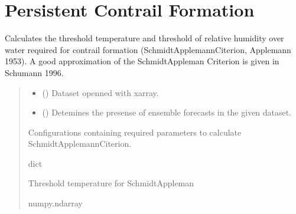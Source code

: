 \documentclass[a4paper,11pt,english]{sphinxmanual}
\begin{document}
\label{\detokenize{modules:module-climaccf.weather_store}}

\section{Persistent Contrail Formation}
\label{\detokenize{modules:module-climaccf.contrail}}\label{\detokenize{modules:persistent-contrail-formation}}

\begin{fulllineitems}
\label{\detokenize{modules:climaccf.contrail.get_cont_form_thr}}
\pysigstartsignatures
{}
\pysigstopsignatures
\sphinxAtStartPar
Calculates the threshold temperature and threshold of relative humidity over water required for contrail formation (Schmidt\sphinxhyphen{}Applemann\sphinxhyphen{}Citerion, Applemann 1953). A good approximation of the Schmidt\sphinxhyphen{}Appleman Criterion is given in Schumann 1996.
\begin{quote}\begin{description}
\begin{itemize}
\item {} 
\sphinxAtStartPar
{} () \textendash{} Dataset openned with xarray.

\item {} 
\sphinxAtStartPar
{} () \textendash{} Detemines the presense of ensemble forecasts in the given dataset.

\end{itemize}

\sphinxAtStartPar
Configurations containing required parameters to calculate Schmidt\sphinxhyphen{}Applemann\sphinxhyphen{}Citerion.

\sphinxAtStartPar
dict

\sphinxAtStartPar
Threshold temperature for Schmidt\sphinxhyphen{}Appleman

\sphinxAtStartPar
numpy.ndarray

\end{description}\end{quote}

\end{fulllineitems}
\end{document}
